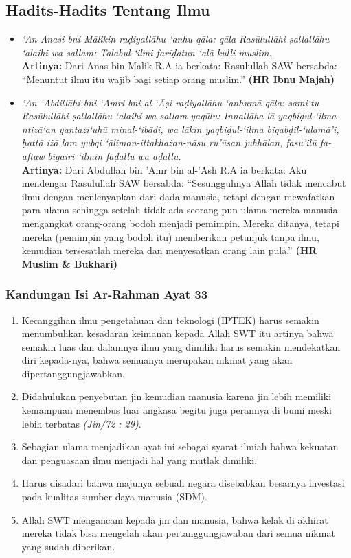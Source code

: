 \subsection{Hadits-Hadits Tentang Ilmu}
\begin{itemize}
\item \textit{‘An Anasi bni Mālikin raḍiyallāhu ‘anhu qāla: qāla Rasūlullāhi ṣallallāhu ‘alaihi wa sallam: Talabul-‘ilmi farīḍatun ‘alā kulli muslim.} \\
  \textbf{Artinya: }Dari Anas bin Malik R.A ia berkata: Rasulullah SAW bersabda: ``Menuntut ilmu itu wajib bagi setiap orang muslim.'' \textbf{(HR Ibnu Majah)}

\item \textit{‘An ‘Abdillāhi bni ‘Amri bni al-‘Āṣi raḍiyallāhu ‘anhumā qāla: sami‘tu Rasūlullāhi ṣallallāhu ‘alaihi wa sallam yaqūlu: Innallāha lā yaqbiḍul-‘ilma-ntizā‘an yantazi‘uhū minal-‘ibādi, wa lākin yaqbiḍul-‘ilma biqabḍil-‘ulamā’i, ḥattā iżā lam yubqi ‘āliman-ittakhażan-nāsu ru’ūsan juhhālan, fasu’ilū fa-aftaw bigairi ‘ilmin faḍallū wa aḍallū.} \\
  \textbf{Artinya: }Dari Abdullah bin 'Amr bin al-'Ash R.A ia berkata: Aku mendengar Rasulullah SAW bersabda: ``Sesungguhnya Allah tidak mencabut ilmu dengan menlenyapkan dari dada manusia, tetapi dengan mewafatkan para ulama sehingga setelah tidak ada seorang pun ulama mereka manusia mengangkat orang-orang bodoh menjadi pemimpin. Mereka ditanya, tetapi mereka (pemimpin yang bodoh itu) memberikan petunjuk tanpa ilmu, kemudian tersesatlah mereka dan menyesatkan orang lain pula.'' \textbf{(HR Muslim \& Bukhari)}
\end{itemize}

\subsubsection{Kandungan Isi Ar-Rahman Ayat 33}
\begin{enumerate}
\item Kecanggihan ilmu pengetahuan dan teknologi (IPTEK) harus semakin menumbuhkan kesadaran keimanan kepada Allah SWT itu artinya bahwa semakin luas dan dalamnya ilmu yang dimiliki harus semakin mendekatkan diri kepada-nya, bahwa semuanya merupakan nikmat yang akan dipertanggungjawabkan.
\item Didahulukan penyebutan jin kemudian manusia karena jin lebih memiliki kemampuan menembus luar angkasa begitu juga perannya di bumi meski lebih terbatas \textit{(Jin/72 : 29)}.
\item Sebagian ulama menjadikan ayat ini sebagai syarat ilmiah bahwa kekuatan dan penguasaan ilmu menjadi hal yang mutlak dimiliki.
\item Harus disadari bahwa majunya sebuah negara disebabkan besarnya investasi pada kualitas sumber daya manusia (SDM).
\item Allah SWT mengancam kepada jin dan manusia, bahwa kelak di akhirat mereka tidak bisa mengelah akan pertanggungjawaban dari semua nikmat yang sudah diberikan.
\end{enumerate}
